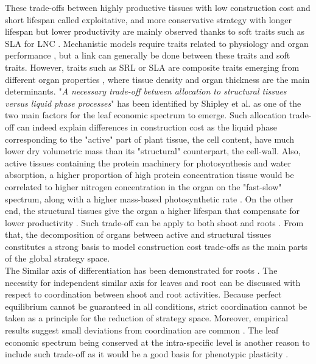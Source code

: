 These trade-offs between highly productive tissues with low construction cost and short lifespan called exploitative, and more conservative strategy with longer lifespan but lower productivity are mainly observed thanks to soft traits such as SLA for LNC \parencite{wright_worldwide_2004}. Mechanistic models require traits related to physiology and organ performance \parencite{soussana_gemini:_2012, lohier_explaining_2014}, but a link can generally be done between these traits and soft traits. However, traits such as SRL or SLA are composite traits emerging from different organ properties \parencite{ryser_importance_1996,john_anatomical_2017}, where tissue density and organ thickness are the main determinants. "\textit{A necessary trade-off between allocation to structural tissues versus liquid phase processes}" has been identified by Shipley et al. \parencite{shipley_fundamental_2006} as one of the two main factors for the leaf economic spectrum to emerge. Such allocation trade-off can indeed explain differences in construction cost as the liquid phase corresponding to the "active" part of plant tissue, the cell content, have much lower dry volumetric mass than its "structural" counterpart, the cell-wall. Also, active tissues containing the protein machinery for photosynthesis and water absorption, a higher proportion of high protein concentration tissue would be correlated to higher nitrogen concentration in the organ on the "fast-slow" spectrum, along with a higher mass-based photosynthetic rate \parencite{reich_world-wide_2014}. On the other end, the structural tissues give the organ a higher lifespan \parencite{mediavilla_internal_2001, ryser_importance_1996} that compensate for lower productivity \parencite{westoby_time_2000}. Such trade-off can be apply to both shoot and roots \parencite{craine_functional_2002, tjoelker_linking_2005, reich_world-wide_2014}. From that, the decomposition of organs between active and structural tissues constitutes a strong basis to model construction cost trade-offs as the main parts of the global strategy space.\\

The Similar axis of differentiation has been demonstrated for roots \parencite{ reich_world-wide_2014, tjoelker_linking_2015, picon-cochard_effect_2012}. The necessity for independent similar axis for leaves and root can be discussed with respect to coordination between shoot and root activities. Because perfect equilibrium cannot be guaranteed in all conditions, strict coordination cannot be taken as a principle for the reduction of strategy space. Moreover, empirical results suggest small deviations from coordination are common \parencite{freschet_explaining_2015}. The leaf economic spectrum being conserved at the intra-specific level \parencite{ hu_novel_2015} is another reason to include such trade-off as it would be a good basis for phenotypic plasticity \parencite{freschet_plasticity_2013}.\\


